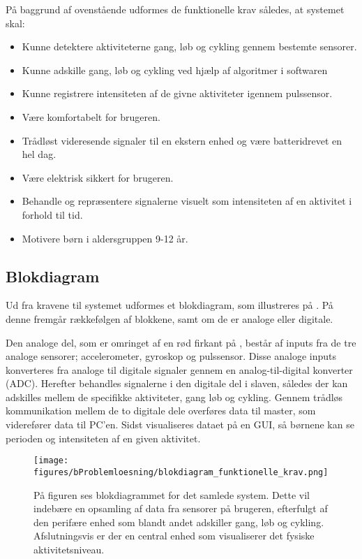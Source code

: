 På baggrund af ovenstående udformes de funktionelle krav således, at systemet skal: 
\begin{itemize}
	\item Kunne detektere aktiviteterne gang, løb og cykling gennem bestemte sensorer.
	\item Kunne adskille gang, løb og cykling ved hjælp af algoritmer i softwaren 
	\item Kunne registrere intensiteten af de givne aktiviteter igennem pulssensor.
	\item Være komfortabelt for brugeren.
	\item Trådløst videresende signaler til en ekstern enhed og være batteridrevet en hel dag.
	\item Være elektrisk sikkert for brugeren.
	\item Behandle og repræsentere signalerne visuelt som intensiteten af en aktivitet i forhold til tid.
	\item Motivere børn i aldersgruppen 9-12 år. 
\end{itemize}

\subsection{Blokdiagram}
Ud fra kravene til systemet udformes et blokdiagram, som illustreres på . På denne fremgår rækkefølgen af blokkene, samt om de er analoge eller digitale. 

Den analoge del, som er omringet af en rød firkant på , består af inputs fra de tre analoge sensorer; accelerometer, gyroskop og pulssensor. Disse analoge inputs konverteres fra analoge til digitale signaler gennem en analog-til-digital konverter (ADC). Herefter behandles signalerne i den digitale del i slaven, således der kan adskilles mellem de specifikke aktiviteter, gang løb og cykling. Gennem trådløs kommunikation mellem de to digitale dele overføres data til master, som viderefører data til PC'en. Sidst visualiseres dataet på en GUI, så børnene kan se perioden og intensiteten af en given aktivitet.  

 \begin{figure}[H]
 	\centering
 	\texttt{[image: figures/bProblemloesning/blokdiagram\_funktionelle\_krav.png]}
 	\caption{På figuren ses blokdiagrammet for det samlede system. Dette vil indebære en opsamling af data fra sensorer på brugeren, efterfulgt af den perifære enhed som blandt andet adskiller gang, løb og cykling. Afslutningsvis er der en central enhed som visualiserer det fysiske aktivitetsniveau.}
 	\label{fig:blokdiagram}
 \end{figure}